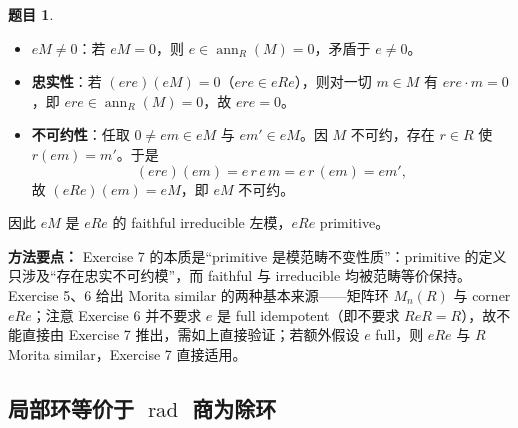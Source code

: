 \documentclass[a4paper]{ctexart}
\theoremstyle{definition}
\newtheorem{example}{题目}[section]
\theoremstyle{analysis}
\theoremstyle{plain}
\begin{document}
\begin{example}
\begin{itemize}
  \item \(eM\neq 0\)：若 \(eM=0\)，则 \(e\in\operatorname{ann}_R(M)=0\)，矛盾于 \(e\neq 0\)。
  \item \textbf{忠实性}：若 \((ere)(eM)=0\)（\(ere\in eRe\)），则对一切 \(m\in M\) 有 \(ere\cdot m=0\)，即 \(ere\in\operatorname{ann}_R(M)=0\)，故 \(ere=0\)。
  \item \textbf{不可约性}：任取 \(0\neq em\in eM\) 与 \(em'\in eM\)。因 \(M\) 不可约，存在 \(r\in R\) 使 \(r(em)=m'\)。于是
  \[
    (ere)(em)=e\,r\,e\,m=e\,r\,(em)=em',
  \]
  故 \((eRe)(em)=eM\)，即 \(eM\) 不可约。
\end{itemize}

因此 \(eM\) 是 \(eRe\) 的 faithful irreducible 左模，\(eRe\) primitive。

\medskip

\textbf{方法要点：}
Exercise 7 的本质是“primitive 是模范畴不变性质”：primitive 的定义只涉及“存在忠实不可约模”，而 faithful 与 irreducible 均被范畴等价保持。Exercise 5、6 给出 Morita similar 的两种基本来源——矩阵环 \(M_n(R)\) 与 corner \(eRe\)；注意 Exercise 6 并不要求 \(e\) 是 full idempotent（即不要求 \(ReR=R\)），故不能直接由 Exercise 7 推出，需如上直接验证；若额外假设 \(e\) full，则 \(eRe\) 与 \(R\) Morita similar，Exercise 7 直接适用。
\end{example}

\subsection{\texorpdfstring{局部环等价于 \(\operatorname{rad}\) 商为除环}{局部环等价于 rad 商为除环}}\label{subsec:problem-local-rad-division-ring}
\end{document}
